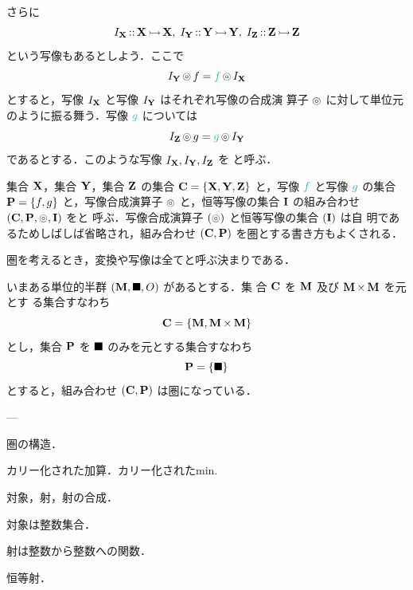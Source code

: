 \documentclass[a5paper,twoside,fleqn,draft]{jsbook}
\begin{document}
さらに
\begin{equation}
I_{\mathbf{X}}\operatorname{:\!:}\mathbf{X}\operatorname{\rightarrowtail}\mathbf{X},\;
I_{\mathbf{Y}}\operatorname{:\!:}\mathbf{Y}\operatorname{\rightarrowtail}\mathbf{Y},\;
I_{\mathbf{Z}}\operatorname{:\!:}\mathbf{Z}\operatorname{\rightarrowtail}\mathbf{Z}
\end{equation}
という写像もあるとしよう．ここで
\begin{equation}
I_\mSet{Y}\mCompProj f=\hFunc{f}\mCompProj I_\mSet{X}
\end{equation}
とすると，写像 $I_{\mathbf{X}}$ と写像 $I_{\mathbf{Y}}$ はそれぞれ写像の合成演
算子 $\operatorname{\circledcirc}$ に対して単位元のように振る舞う．写像 $\hFunc{g}$ については
\begin{equation}
I_\mSet{Z}\mCompProj g=\hFunc{g}\mCompProj I_\mSet{Y}
\end{equation}
であるとする．このような写像 $I_{\mathbf{X}},I_{\mathbf{Y}},I_{\mathbf{Z}}$ を
と呼ぶ．

集合 $\mathbf{X}$，集合 $\mathbf{Y}$，集合 $\mathbf{Z}$ の集合
$\mathbf{C}=\{\mathbf{X},\mathbf{Y},\mathbf{Z}\}$ と，写像 $\hFunc{f}$ と写像
$\hFunc{g}$ の集合 $\mathbf{P}=\{f,g\}$ と，写像合成演算子 $\operatorname{\circledcirc}$
と，恒等写像の集合 $\mathbf{I}$ の組み合わせ
$\left(\mathbf{C},\mathbf{P},\operatorname{\circledcirc},\mathbf{I}\right)$ をと
呼ぶ．写像合成演算子 $(\operatorname{\circledcirc})$ と恒等写像の集合 $(\mathbf{I})$ は自
明であるためしばしば省略され，組み合わせ
$\left(\mathbf{C},\mathbf{P}\right)$ を圏とする書き方もよくされる．

圏を考えるとき，変換や写像は全てと呼ぶ決まりである．

いまある単位的半群 $\left(\mathbf{M},\operatorname{\blacksquare},O\right)$ があるとする．集
合 $\mathbf{C}$ を $\mathbf{M}$ 及び $\mathbf{M}\operatorname{\bf{\times}}\mathbf{M}$ を元とす
る集合すなわち
\begin{equation}
\mathbf{C}=\{\mathbf{M},\mathbf{M}\operatorname{\bf{\times}}\mathbf{M}\}
\end{equation}
とし，集合 $\mathbf{P}$ を $\operatorname{\blacksquare}$ のみを元とする集合すなわち
\begin{equation}
\mathbf{P}=\{\operatorname{\blacksquare}\}
\end{equation}
とすると，組み合わせ $\left(\mathbf{C},\mathbf{P}\right)$ は圏になっている．

---

圏の構造．

カリー化された加算．カリー化されたmin.

対象，射，射の合成．

対象は整数集合．

射は整数から整数への関数．

恒等射．
\end{document}
